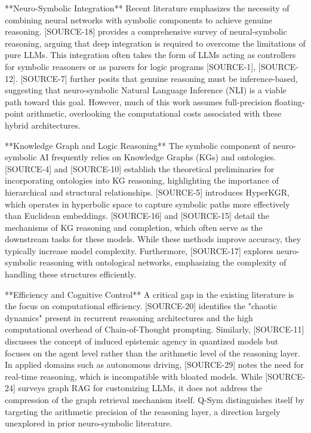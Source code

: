 \documentclass{article}
\begin{document}
**Neuro-Symbolic Integration**
Recent literature emphasizes the necessity of combining neural networks with symbolic components to achieve genuine reasoning. [SOURCE-18] provides a comprehensive survey of neural-symbolic reasoning, arguing that deep integration is required to overcome the limitations of pure LLMs. This integration often takes the form of LLMs acting as controllers for symbolic reasoners or as parsers for logic programs [SOURCE-1], [SOURCE-12]. [SOURCE-7] further posits that genuine reasoning must be inference-based, suggesting that neuro-symbolic Natural Language Inference (NLI) is a viable path toward this goal. However, much of this work assumes full-precision floating-point arithmetic, overlooking the computational costs associated with these hybrid architectures.

**Knowledge Graph and Logic Reasoning**
The symbolic component of neuro-symbolic AI frequently relies on Knowledge Graphs (KGs) and ontologies. [SOURCE-4] and [SOURCE-10] establish the theoretical preliminaries for incorporating ontologies into KG reasoning, highlighting the importance of hierarchical and structural relationships. [SOURCE-5] introduces HyperKGR, which operates in hyperbolic space to capture symbolic paths more effectively than Euclidean embeddings. [SOURCE-16] and [SOURCE-15] detail the mechanisms of KG reasoning and completion, which often serve as the downstream tasks for these models. While these methods improve accuracy, they typically increase model complexity. Furthermore, [SOURCE-17] explores neuro-symbolic reasoning with ontological networks, emphasizing the complexity of handling these structures efficiently.

**Efficiency and Cognitive Control**
A critical gap in the existing literature is the focus on computational efficiency. [SOURCE-20] identifies the "chaotic dynamics" present in recurrent reasoning architectures and the high computational overhead of Chain-of-Thought prompting. Similarly, [SOURCE-11] discusses the concept of induced epistemic agency in quantized models but focuses on the agent level rather than the arithmetic level of the reasoning layer. In applied domains such as autonomous driving, [SOURCE-29] notes the need for real-time reasoning, which is incompatible with bloated models. While [SOURCE-24] surveys graph RAG for customizing LLMs, it does not address the compression of the graph retrieval mechanism itself. Q-Sym distinguishes itself by targeting the arithmetic precision of the reasoning layer, a direction largely unexplored in prior neuro-symbolic literature.
\end{document}
